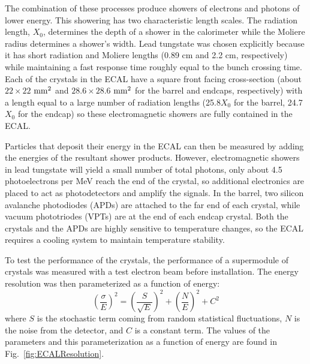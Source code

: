 The combination of these processes produce showers of electrons and photons of lower energy. This showering has two characteristic length scales. The radiation length, $X_0$, determines the depth of a shower in the calorimeter while the Moliere radius determines a shower's width. Lead tungstate was chosen explicitly because it has short radiation and Moliere lengths (0.89 cm and 2.2 cm, respectively) while maintaining a fast response time roughly equal to the bunch crossing time. Each of the crystals in the ECAL have a square front facing cross-section (about $22\times22$ $\rm{mm}^2$ and $28.6\times28.6$ $\rm{mm}^2$ for the barrel and endcaps, respectively) with a length equal to a large number of radiation lengths (25.8$X_0$ for the barrel, 24.7$X_0$ for the endcap) so these electromagnetic showers are fully contained in the ECAL. 

Particles that deposit their energy in the ECAL can then be measured by adding the energies of the resultant shower products. However, electromagnetic showers in lead tungstate will yield a small number of total photons, only about 4.5 photoelectrons per MeV reach the end of the crystal, so additional electronics are placed to act as photodetectors and amplify the signals. In the barrel, two silicon avalanche photodiodes (APDs) are attached to the far end of each crystal, while vacuum phototriodes (VPTs) are at the end of each endcap crystal. Both the crystals and the APDs are highly sensitive to temperature changes, so the ECAL requires a cooling system to maintain temperature stability. 

To test the performance of the crystals, the performance of a supermodule of crystals was measured with a test electron beam before installation. The energy resolution was then parameterized as a function of energy:
\begin{equation}
\left(\frac{\sigma}{E}\right)^2 = \left(\frac{S}{\sqrt{E}}\right)^2 + \left(\frac{N}{E}\right)^2 + C^2
\end{equation}
where $S$ is the stochastic term coming from random statistical fluctuations, $N$ is the noise from the detector, and $C$ is a constant term. The values of the parameters and this parameterization as a function of energy are found in Fig.~\ref{fig:ECALResolution}.

